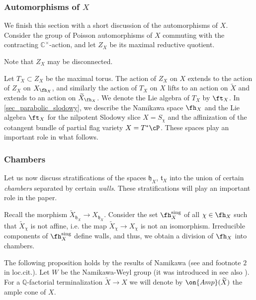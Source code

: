 \documentclass[12pt]{amsart}
\begin{document}
 \subsubsection{Automorphisms of $X$}        We finish this section with a short discussion of the automorphisms of $X$. Consider the group of Poisson automorphisms of $X$ commuting with the contracting $\mathbb{C}^\times$-action, and let $Z_X$ be its maximal reductive quotient.

    \begin{warning}\label{warning disconnected group}
    Note that $Z_X$ may be disconnected.     
    \end{warning}        

    Let $T_X\subset Z_X$ be the maximal torus. The action of $Z_X$ on $X$ extends to the action of $Z_X$ on $X_{\fh_X}$, and similarly the action of $T_X$ on $X$ lifts to an action on $\widetilde{X}$ and extends to an action on $\widetilde{X}_{\fh_X}$. %
We denote the Lie algebra of $T_X$ by $\ft_X$. In \cref{sec_parabolic_slodowy}, we describe the Namikawa space $\fh_X$ and the Lie algebra $\ft_X$ for the nilpotent Slodowy slice $X=S_\chi$ and the affinization of the cotangent bundle of partial flag variety $X=T^*\cP$. These spaces play an important role in what follows.


\subsubsection{Chambers}\label{subsub_chambers} Let us now discuss stratifications of the spaces $\mathfrak{h}_X$, $\mathfrak{t}_X$ into the union of certain {\emph{chambers}} separated by certain {\emph{walls}}. These stratifications will play an important role in the paper. 

Recall the morphism $\widetilde{X}_{\mathfrak{h}_X} \rightarrow X_{\mathfrak{h}_X}$.  Consider the set $\fh_X^{\mathrm{sing}}$ of all $\chi\in \fh_X$ such that $\widetilde{X}_\chi$ is not affine, i.e. the map $\widetilde{X}_\chi \to X_\chi$ is not an isomorphism. Irreducible components of $\fh_X^{\mathrm{sing}}$ define walls, and thus, we obtain a division of $\fh_X$ into chambers.


The following proposition holds by the results of Namikawa (see  \cite[Main Theorem]{Namikawa_bir} and footnote $2$ in loc.cit.). Let $W$ be the Namikawa-Weyl group (it was introduced in \cite{Namikawa2} %
see also \cite[Section 2.3]{Losev4}). For a $\mathbb{Q}$-factorial terminalization $\widetilde{X} \rightarrow X$ we will denote by $\on{Amp}(\widetilde{X})$ the ample cone of $X$.  
\end{document}
